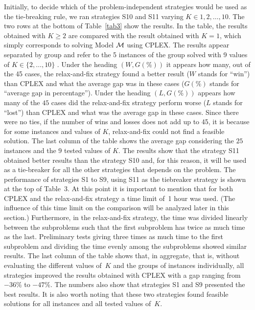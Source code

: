 \documentclass[11pt]{article}
\begin{document}
Initially, to decide which of the problem-independent strategies would be used as the tie-breaking rule, we ran strategies S10 and S11 varying $K \in {1,2,\dots,10}$. The two rows at the bottom of Table~\ref{tab3} show the results. In the table, the results obtained with $K \geq 2$ are compared with the result obtained with $K=1$, which simply corresponds to solving Model ${\cal M}$ using CPLEX. The results appear separated by group and refer to the 5 instances of the group solved with 9 values of $K \in \{2,\dots,10\}$ . Under the heading $(W,G(\%))$ it appears how many, out of the 45 cases, the relax-and-fix strategy found a better result ($W$ stands for ``win'') than CPLEX and what the average gap was in these cases ($G(\%)$ stands for ``average gap in percentage''). Under the heading $(L,G(\%))$ appears how many of the $45$ cases did the relax-and-fix strategy perform worse ($L$ stands for ``lost'') than CPLEX and what was the average gap in these cases. Since there were no ties, if the number of wins and losses does not add up to 45, it is because for some instances and values of $K$, relax-and-fix could not find a feasible solution. The last column of the table shows the average gap considering the $25$ instances and the 9 tested values of $K$. The results show that the strategy S11 obtained better results than the strategy S10 and, for this reason, it will be used as a tie-breaker for all the other strategies that depends on the problem. The performance of strategies S1 to S9, using S11 as the tiebreaker strategy is shown at the top of Table~3. At this point it is important to mention that for both CPLEX and the relax-and-fix strategy a time limit of~1 hour was used. (The influence of this time limit on the comparison will be analyzed later in this section.) Furthermore, in the relax-and-fix strategy, the time was divided linearly between the subproblems such that the first subproblem has twice as much time as the last. Preliminary tests giving three times as much time to the first subproblem and dividing the time evenly among the subproblems showed similar results. The last column of the table shows that, in aggregate, that is, without evaluating the different values of~$K$ and the groups of instances individually, all strategies improved the results obtained with CPLEX with a gap ranging from $-36\%$ to $-47\%$. The numbers also show that strategies S1 and S9 presented the best results. It is also worth noting that these two strategies found feasible solutions for all instances and all tested values of~$K$. 
\end{document}
